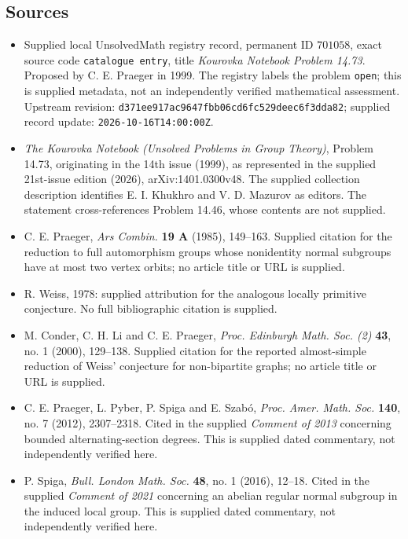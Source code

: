 \documentclass[11pt]{article}
\begin{document}
\subsection{Sources}
\begin{itemize}
\item Supplied local UnsolvedMath registry record, permanent ID \(701058\), exact source code \texttt{catalogue entry}, title \emph{Kourovka Notebook Problem 14.73}. Proposed by C. E. Praeger in 1999. The registry labels the problem \texttt{open}; this is supplied metadata, not an independently verified mathematical assessment. Upstream revision: \texttt{d371ee917ac9647fbb06cd6fc529deec6f3dda82}; supplied record update: \texttt{2026-10-16T14:00:00Z}.
\item \emph{The Kourovka Notebook (Unsolved Problems in Group Theory)}, Problem 14.73, originating in the 14th issue (1999), as represented in the supplied 21st-issue edition (2026), arXiv:1401.0300v48. The supplied collection description identifies E. I. Khukhro and V. D. Mazurov as editors. The statement cross-references Problem 14.46, whose contents are not supplied.
\item C. E. Praeger, \emph{Ars Combin.} \textbf{19 A} (1985), 149--163. Supplied citation for the reduction to full automorphism groups whose nonidentity normal subgroups have at most two vertex orbits; no article title or URL is supplied.
\item R. Weiss, 1978: supplied attribution for the analogous locally primitive conjecture. No full bibliographic citation is supplied.
\item M. Conder, C. H. Li and C. E. Praeger, \emph{Proc. Edinburgh Math. Soc. (2)} \textbf{43}, no. 1 (2000), 129--138. Supplied citation for the reported almost-simple reduction of Weiss' conjecture for non-bipartite graphs; no article title or URL is supplied.
\item C. E. Praeger, L. Pyber, P. Spiga and E. Szab\'{o}, \emph{Proc. Amer. Math. Soc.} \textbf{140}, no. 7 (2012), 2307--2318. Cited in the supplied \emph{Comment of 2013} concerning bounded alternating-section degrees. This is supplied dated commentary, not independently verified here.
\item P. Spiga, \emph{Bull. London Math. Soc.} \textbf{48}, no. 1 (2016), 12--18. Cited in the supplied \emph{Comment of 2021} concerning an abelian regular normal subgroup in the induced local group. This is supplied dated commentary, not independently verified here.
\end{itemize}
\end{document}
